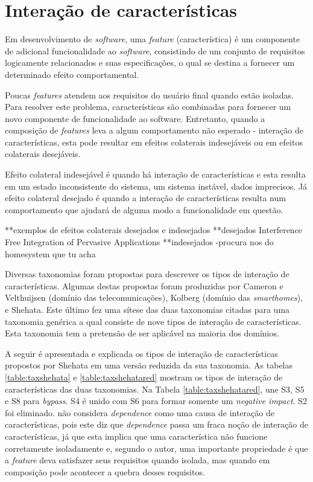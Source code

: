 \section{Interação de características}
Em desenvolvimento de \textit{software}, uma \textit{feature} (característica) é um componente de adicional funcionalidade ao \textit{software}\cite{Calder:2003}, consistindo de um conjunto de requisitos logicamente relacionados e suas especificações, o qual se destina a fornecer um determinado efeito comportamental\cite{NHLABATSI:2008}.

Poucas \textit{features} atendem aos requisitos do usuário final quando estão isoladas. Para resolver este problema, características são combinadas para fornecer um novo componente de funcionalidade ao software. Entretanto, quando a composição de \textit{features} leva a algum comportamento não esperado - interação de características, esta pode resultar em efeitos colaterais indesejáveis\cite{NHLABATSI:2008} ou em efeitos colaterais desejáveis\cite{Weiss:2005}.

Efeito colateral indesejável é quando há interação de características e esta resulta em um estado inconsistente do sistema, um sistema instável, dados imprecisos. Já efeito colateral desejado é quando a interação de características resulta num comportamento que ajudará de alguma modo a funcionalidade em questão.\cite{Weiss:2005}\cite{NHLABATSI:2008}

**exemplos de efeitos colaterais desejados e indesejados
**desejados
Interference Free Integration of Pervasive Applications
**indesejados
-procura nos do homesystem que tu acha

Diversas taxonomias foram propostas para descrever os tipos de interação de características. Algumas destas propostas foram produzidas por Cameron e Velthuijsen (domínio das telecomunicações), Kolberg (domínio das \textit{smarthomes}), e Shehata. Este último fez uma sítese das duas taxonomias citadas para uma taxonomia genérica a qual consiste de nove tipos de interação de características. Esta taxonomia tem a pretensão de ser aplicável na maioria dos domínios.\cite{NHLABATSI:2008}

A seguir é apresentada e explicada os tipos de interação de características propostos por Shehata em uma versão reduzida da sua taxonomia. As tabelas \ref{table:taxshehata} e \ref{table:taxshehatared} mostram os tipos de interação de características das duas taxonomias. Na Tabela \ref{table:taxshehatared}, \cite{NHLABATSI:2008} une S3, S5 e S8 para \textit{bypass}. S4 é unido com S6 para formar somente um \textit{negative impact}. S2 foi eliminado. \cite{NHLABATSI:2008} não considera \textit{dependence} como uma causa de interação de características, pois este diz que \textit{dependence} passa um fraca noção de interação de características, já que esta implica que uma característica não funcione corretamente isoladamente e, segundo o autor, uma importante propriedade é que a \textit{feature} deva satisfazer seus requisitos quando isolada, mas quando em composição pode acontecer a quebra desses requisitos. 


